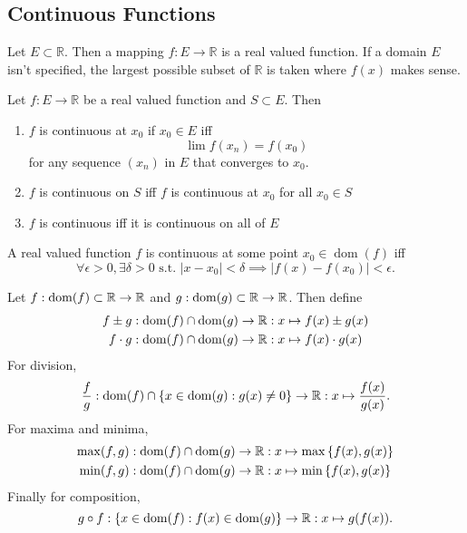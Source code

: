 \documentclass[../notes.tex]{subfiles}
\begin{document}

\subsection{Continuous Functions}

\begin{definition}
    Let $E \subset \mathbb{R}$. Then a mapping $f : E \to \mathbb{R}$ is a real valued function. If a domain $E$ isn't specified, the largest possible subset of $\mathbb{R}$ is taken where $f(x)$ makes sense.
\end{definition}

\begin{definition}[Continuity]
    Let $f : E \to \mathbb{R}$ be a real valued function and $S \subset E$. Then
    \begin{enumerate}
        \item $f$ is continuous at $x_0$ if $x_0 \in E$ iff
            \[
                \lim f(x_n) = f(x_0)
            \]
            for any sequence $(x_n)$ in $E$ that converges to $x_0$.
        \item $f$ is continuous on $S$ iff $f$ is continuous at $x_0$ for all $x_0 \in S$
        \item $f$ is continuous iff it is continuous on all of $E$
    \end{enumerate}
\end{definition}

\begin{theorem}
    A real valued function $f$ is continuous at some point $x_0 \in \operatorname{dom}(f)$ iff
    \[
        \forall \epsilon >0, \exists \delta > 0 \text{ s.t. } |x - x_0| < \delta \implies |f(x) - f(x_0)| < \epsilon
    .\]
\end{theorem}

\begin{definition}
    Let $f : \operatorname{dom}(f) \subset \mathbb{R} \to \mathbb{R}$ and $g : \operatorname{dom}(g) \subset \mathbb{R} \to \mathbb{R}$. Then define
    \begin{align*}
        f \pm g : \operatorname{dom}(f) \cap \operatorname{dom}(g) \to \mathbb{R} &: x \mapsto f(x) \pm g(x) \\
        f \cdot g : \operatorname{dom}(f) \cap \operatorname{dom}(g) \to \mathbb{R} &: x \mapsto f(x) \cdot g(x) \\
    \end{align*}
    For division,
    \[
        \frac{f}{g} : \operatorname{dom}(f) \cap \qty{x \in \operatorname{dom}(g) : g(x) \neq 0} \to \mathbb{R} : x \mapsto \frac{f(x)}{g(x)}
    .\]
    For maxima and minima,
    \begin{align*}
        \max(f,g) : \operatorname{dom}(f) \cap \operatorname{dom}(g) \to \mathbb{R} &: x \mapsto \max\qty{f(x), g(x)} \\
        \min(f,g) : \operatorname{dom}(f) \cap \operatorname{dom}(g) \to \mathbb{R} &: x \mapsto \min\qty{f(x), g(x)} \\
    \end{align*}
    Finally for composition,
    \[
        g \circ f : \qty{x \in \operatorname{dom}(f) : f(x) \in \operatorname{dom}(g)} \to \mathbb{R} : x \mapsto g(f(x))
    .\]
\end{definition}
\end{document}
